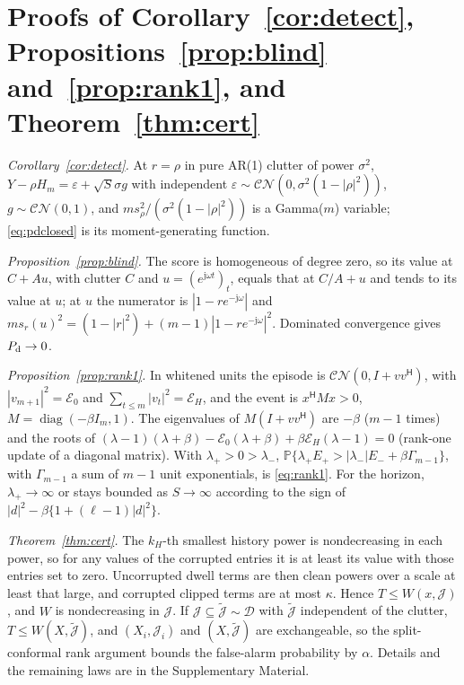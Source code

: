 \documentclass[journal]{IEEEtran}
\newcommand{\PP}{\mathbb{P}}
\begin{document}
\section{Proofs of Corollary~\ref{cor:detect}, Propositions~\ref{prop:blind} and~\ref{prop:rank1}, and Theorem~\ref{thm:cert}}\label{app:detect}
\emph{Corollary~\ref{cor:detect}.} At $r=\rho$ in pure AR(1) clutter of power $\sigma^2$, $Y-\rho H_m=\varepsilon+\sqrt S\sigma g$ with independent $\varepsilon\sim\mathcal{CN}(0,\sigma^2(1-|\rho|^2))$, $g\sim\mathcal{CN}(0,1)$, and $ms_\rho^2/(\sigma^2(1-|\rho|^2))$ is a Gamma($m$) variable; \eqref{eq:pdclosed} is its moment-generating function.

\emph{Proposition~\ref{prop:blind}.} The score is homogeneous of degree zero, so its value at $C+Au$, with clutter $C$ and $u=(e^{\mathrm j\omega t})_t$, equals that at $C/A+u$ and tends to its value at $u$; at $u$ the numerator is $|1-re^{-\mathrm j\omega}|$ and $ms_r(u)^2=(1-|r|^2)+(m-1)|1-re^{-\mathrm j\omega}|^2$. Dominated convergence gives $P_{\rm d}\to0$.

\emph{Proposition~\ref{prop:rank1}.} In whitened units the episode is $\mathcal{CN}(0,I+vv^{\mathsf H})$, with $|v_{m+1}|^2=\mathcal E_0$ and $\sum_{t\le m}|v_t|^2=\mathcal E_H$, and the event is $x^{\mathsf H}Mx>0$, $M=\operatorname{diag}(-\beta I_m,1)$. The eigenvalues of $M(I+vv^{\mathsf H})$ are $-\beta$ ($m-1$ times) and the roots of $(\lambda-1)(\lambda+\beta)-\mathcal E_0(\lambda+\beta)+\beta\mathcal E_H(\lambda-1)=0$ (rank-one update of a diagonal matrix). With $\lambda_+>0>\lambda_-$, $\PP\{\lambda_+E_+>|\lambda_-|E_-+\beta\Gamma_{m-1}\}$, with $\Gamma_{m-1}$ a sum of $m-1$ unit exponentials, is \eqref{eq:rank1}. For the horizon, $\lambda_+\to\infty$ or stays bounded as $S\to\infty$ according to the sign of $|d|^2-\beta\{1+(\ell-1)|d|^2\}$.

\emph{Theorem~\ref{thm:cert}.} The $k_H$-th smallest history power is nondecreasing in each power, so for any values of the corrupted entries it is at least its value with those entries set to zero. Uncorrupted dwell terms are then clean powers over a scale at least that large, and corrupted clipped terms are at most $\kappa$. Hence $T\le W(x,\mathcal J)$, and $W$ is nondecreasing in $\mathcal J$. If $\mathcal J\subseteq\tilde{\mathcal J}\sim\mathcal D$ with $\tilde{\mathcal J}$ independent of the clutter, $T\le W(X,\tilde{\mathcal J})$, and $(X_i,\mathcal J_i)$ and $(X,\tilde{\mathcal J})$ are exchangeable, so the split-conformal rank argument bounds the false-alarm probability by $\alpha$. Details and the remaining laws are in the Supplementary Material.
\end{document}
